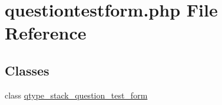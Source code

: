 \hypertarget{questiontestform_8php}{
\section{questiontestform.php File Reference}
\label{questiontestform_8php}
}
\subsection*{Classes}
\begin{DoxyCompactItemize}
\item 
class \hyperlink{classqtype__stack__question__test__form}{qtype\_\-stack\_\-question\_\-test\_\-form}
\end{DoxyCompactItemize}
